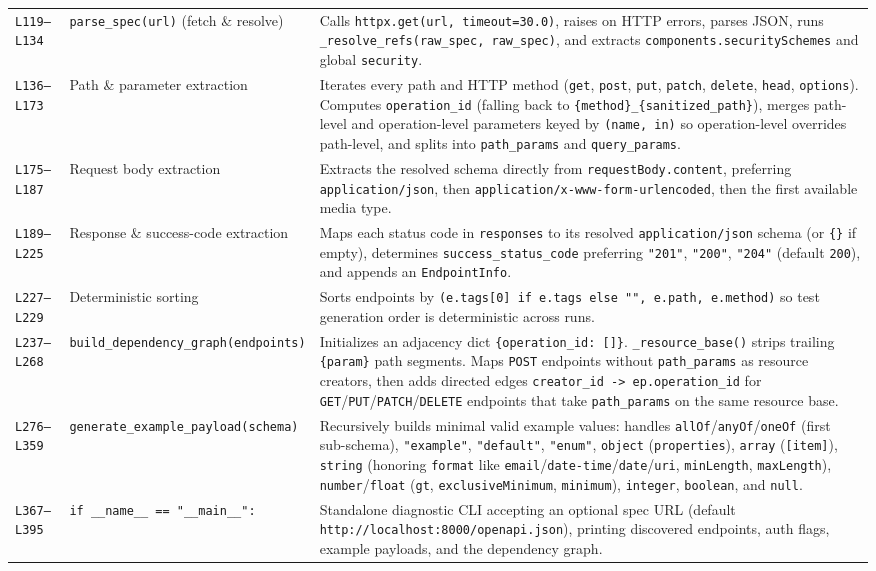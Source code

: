 \documentclass[11pt,a4paper]{article}
\begin{document}
\begin{longtable}{L{1.4cm} L{5.2cm} L{9.0cm}}
\texttt{L119--L134} & \texttt{parse\_spec(url)} (fetch \& resolve) & Calls \texttt{httpx.get(url, timeout=30.0)}, raises on HTTP errors, parses JSON, runs \texttt{\_resolve\_refs(raw\_spec, raw\_spec)}, and extracts \texttt{components.securitySchemes} and global \texttt{security}. \\
\texttt{L136--L173} & Path \& parameter extraction & Iterates every path and HTTP method (\texttt{get}, \texttt{post}, \texttt{put}, \texttt{patch}, \texttt{delete}, \texttt{head}, \texttt{options}). Computes \texttt{operation\_id} (falling back to \texttt{\{method\}\_\{sanitized\_path\}}), merges path-level and operation-level parameters keyed by \texttt{(name, in)} so operation-level overrides path-level, and splits into \texttt{path\_params} and \texttt{query\_params}. \\
\texttt{L175--L187} & Request body extraction & Extracts the resolved schema directly from \texttt{requestBody.content}, preferring \texttt{application/json}, then \texttt{application/x-www-form-urlencoded}, then the first available media type. \\
\texttt{L189--L225} & Response \& success-code extraction & Maps each status code in \texttt{responses} to its resolved \texttt{application/json} schema (or \texttt{\{\}} if empty), determines \texttt{success\_status\_code} preferring \texttt{"201"}, \texttt{"200"}, \texttt{"204"} (default \texttt{200}), and appends an \texttt{EndpointInfo}. \\
\texttt{L227--L229} & Deterministic sorting & Sorts endpoints by \texttt{(e.tags[0] if e.tags else "", e.path, e.method)} so test generation order is deterministic across runs. \\
\texttt{L237--L268} & \texttt{build\_dependency\_graph(endpoints)} & Initializes an adjacency dict \texttt{\{operation\_id: []\}}. \texttt{\_resource\_base()} strips trailing \texttt{\{param\}} path segments. Maps \texttt{POST} endpoints without \texttt{path\_params} as resource creators, then adds directed edges \texttt{creator\_id -> ep.operation\_id} for \texttt{GET}/\texttt{PUT}/\texttt{PATCH}/\texttt{DELETE} endpoints that take \texttt{path\_params} on the same resource base. \\
\texttt{L276--L359} & \texttt{generate\_example\_payload(schema)} & Recursively builds minimal valid example values: handles \texttt{allOf}/\texttt{anyOf}/\texttt{oneOf} (first sub-schema), \texttt{"example"}, \texttt{"default"}, \texttt{"enum"}, \texttt{object} (\texttt{properties}), \texttt{array} (\texttt{[item]}), \texttt{string} (honoring \texttt{format} like \texttt{email}/\texttt{date-time}/\texttt{date}/\texttt{uri}, \texttt{minLength}, \texttt{maxLength}), \texttt{number}/\texttt{float} (\texttt{gt}, \texttt{exclusiveMinimum}, \texttt{minimum}), \texttt{integer}, \texttt{boolean}, and \texttt{null}. \\
\texttt{L367--L395} & \texttt{if \_\_name\_\_ == "\_\_main\_\_":} & Standalone diagnostic CLI accepting an optional spec URL (default \texttt{http://localhost:8000/openapi.json}), printing discovered endpoints, auth flags, example payloads, and the dependency graph. \\
\bottomrule
\end{longtable}
\end{document}
